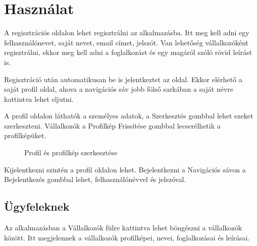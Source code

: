 \clearpage

\section{Használat}

A regisztrációs oldalon lehet regisztrálni az alkalmazásba. Itt meg kell adni egy felhasználónevet, saját nevet, email címet, jelszót. Van lehetőség vállalkozóként regisztrálni, ekkor meg kell adni a foglalkozást és egy magáról szóló rövid leírást is.

Regisztráció után automatikusan be is jelentkeztet az oldal. Ekkor elérhető a saját profil oldal, ahova a navigációs sáv jobb fölső sarkában a saját névre kattintva lehet eljutni.

A profil oldalon láthatók a személyes adatok, a Szerkesztés gombbal lehet ezeket szerkeszteni. Vállalkozók a Profilkép Frissítése gombbal lecserélhetik a profilképüket.

\begin{figure}[H]
    \centering
    \caption{Profil és profilkép szerkesztése}
\end{figure}


Kijelentkezni szintén a profil oldalon lehet. Bejelentkezni a Navigációs sávon a Bejelentkezés gombbal lehet, felhasználónévvel és jelszóval.



\subsection{Ügyfeleknek}

Az alkalmazásban a Vállalkozók fülre kattintva lehet böngészni a vállalkozók között. Itt megjelennek a vállalkozók profilképei, nevei, foglalkozásai és leírásai.

